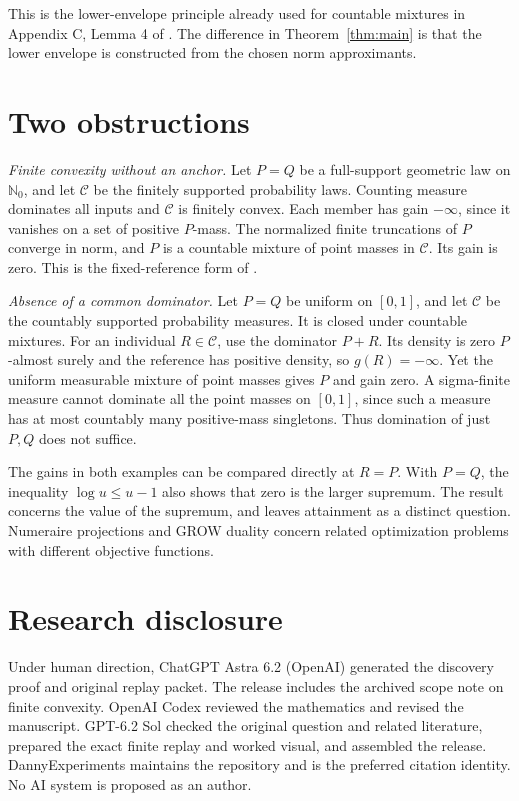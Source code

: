 \documentclass[11pt,a4paper]{amsart}
\begin{document}
This is the lower-envelope principle already used for countable mixtures in Appendix C, Lemma 4 of \cite{lgh}. The difference in Theorem~\ref{thm:main} is that the lower envelope is constructed from the chosen norm approximants.

\section{Two obstructions}

\emph{Finite convexity without an anchor.}
Let \(P=Q\) be a full-support geometric law on \(\mathbb N_0\), and let \(\mathcal C\) be the finitely supported probability laws. Counting measure dominates all inputs and \(\mathcal C\) is finitely convex. Each member has gain \(-\infty\), since it vanishes on a set of positive \(P\)-mass. The normalized finite truncations of \(P\) converge in norm, and \(P\) is a countable mixture of point masses in \(\mathcal C\). Its gain is zero. This is the fixed-reference form of \cite[Example~4]{lgh}.

\emph{Absence of a common dominator.}
Let \(P=Q\) be uniform on \([0,1]\), and let \(\mathcal C\) be the countably supported probability measures. It is closed under countable mixtures. For an individual \(R\in\mathcal C\), use the dominator \(P+R\). Its density is zero \(P\)-almost surely and the reference has positive density, so \(g(R)=-\infty\). Yet the uniform measurable mixture of point masses gives \(P\) and gain zero. A sigma-finite measure cannot dominate all the point masses on \([0,1]\), since such a measure has at most countably many positive-mass singletons. Thus domination of just \(P,Q\) does not suffice.

The gains in both examples can be compared directly at \(R=P\). With \(P=Q\), the inequality \(\log u\le u-1\) also shows that zero is the larger supremum. The result concerns the value of the supremum, and leaves attainment as a distinct question. Numeraire projections \cite{lrr} and GROW duality \cite{rlrr} concern related optimization problems with different objective functions.

\section*{Research disclosure}

\begingroup\raggedright
Under human direction, ChatGPT Astra 6.2 (OpenAI) generated the discovery proof and original replay packet. The release includes the archived scope note on finite convexity. OpenAI Codex reviewed the mathematics and revised the manuscript. GPT-6.2 Sol checked the original question and related literature, prepared the exact finite replay and worked visual, and assembled the release. DannyExperiments maintains the repository and is the preferred citation identity. No AI system is proposed as an author.
\par\endgroup
\end{document}
